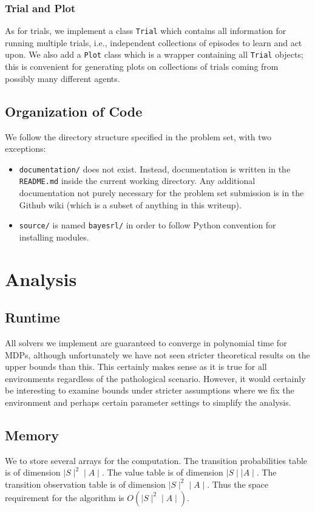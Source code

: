 \documentclass{pset}
\begin{document}
\subsubsection{Trial and Plot}
As for trials, we implement a class \texttt{Trial} which contains all information for running multiple trials, i.e., independent collections of episodes to learn and act upon. We also add a \texttt{Plot} class which is a wrapper containing all \texttt{Trial} objects; this is convenient for generating plots on collections of trials coming from possibly many different agents.

\subsection{Organization of Code}
We follow the directory structure specified in the problem set, with two
exceptions:
\begin{itemize}
\item \texttt{documentation/} does not exist. Instead, documentation is written
in the \texttt{README.md} inside the current working directory. Any additional
documentation not purely necessary for the problem set submission is in the
Github wiki (which is a subset of anything in this writeup).
\item \texttt{source/} is named \texttt{bayesrl/} in order to follow Python
convention for installing modules.
\end{itemize}

\section{Analysis}

\subsection{Runtime}
All solvers we implement are guaranteed to converge in polynomial time for MDPs,
although unfortunately we have not seen stricter theoretical results on the
upper bounds than this. This certainly makes sense as it is true for all
environments regardless of the pathological scenario. However, it would
certainly be interesting to examine bounds under stricter assumptions where we
fix the environment and perhaps certain parameter settings to simplify the
analysis.

\subsection{Memory}
We to store several arrays for the computation. The transition probabilities
table is of dimension $\mid S \mid ^2 \mid A \mid$. The value table is of
dimension $\mid S \mid \mid A \mid$. The transition observation table is of
dimension $\mid S \mid ^2 \mid A \mid$. Thus the space requirement for the
algorithm is $O(\mid S \mid ^2 \mid A \mid)$.
\end{document}
